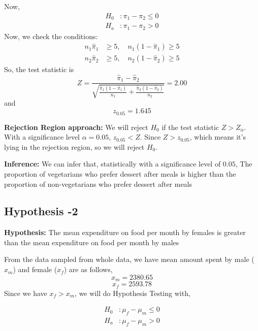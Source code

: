 \documentclass[12pt]{article}
\begin{document}
    Now,
    \begin{align}
        H_0 &: \pi_1 - \pi_2 \leq 0 \\
        H_a &: \pi_1 - \pi_2 > 0
    \end{align}
    Now, we check the conditions:
    \begin{align}
        n_1\hat{\pi}_1 &\geq 5, \quad n_1(1 - \hat{\pi}_1) \geq 5 \\
        n_2\hat{\pi}_2 &\geq 5, \quad n_2(1 - \hat{\pi}_2) \geq 5
    \end{align}
    So, the test statistic is
    \begin{equation}
        Z = \frac{\hat{\pi}_1 - \hat{\pi}_2}{\sqrt{\frac{\hat{\pi}_1(1-\hat{\pi}_1)}{n_1} + \frac{\hat{\pi}_2(1-\hat{\pi}_2)}{n_2}}} = 2.00
    \end{equation}
    and
    \begin{equation}
        z_{0.05} = 1.645
    \end{equation}
     \medskip
     
    \textbf{Rejection Region approach:}
We will reject $H_0$ if the test statistic $Z > Z_{\alpha}$.
With a significance level $\alpha = 0.05$, $z_{0.05} < Z$.
Since $Z > z_{0.05}$, which means it's lying in the rejection region, so we will reject $H_0$.
 \medskip
 
 \textbf{Inference:} We can infer that, statistically with a significance level of $0.05$, The proportion of vegetarians who prefer dessert after meals is higher than the proportion of non-vegetarians who prefer dessert after meals

       
    \subsection{Hypothesis -2}
       \textbf{Hypothesis:}
       The mean expenditure on food per month by females is greater than the mean expenditure on food per month by males
       \medskip
       
    From the data sampled from whole data, we have mean amount spent by male ($x_m$) and female ($x_f$) are as follows,
    \[ x_m = 2380.65 \]
    \[ x_f = 2593.78 \]
    Since we have $x_f > x_m$, we will do Hypothesis Testing with,

    \begin{align}
        H_0 &: \mu_f - \mu_m \leq 0 \\
        H_a &: \mu_f - \mu_m > 0
    \end{align}
    
\end{document}

